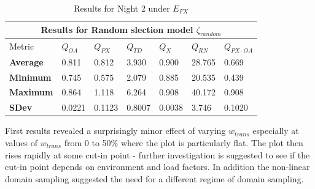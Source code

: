 \begin{table}
\begin{center}
\begin{tabular}{lllllll}
\toprule
\multicolumn{7}{c}{Results for Random slection model $\zeta_{random}$} \\
\midrule
Metric & $Q_{OA}$ & $Q_{PX}$ & $Q_{TD}$ & $Q_{X}$ & $Q_{RN}$ & $Q_{PX \cdot OA}$ \\
\midrule
{\bf Average} & 0.811  & 0.812  & 3.930  & 0.900  & 28.765 & 0.669\\
{\bf Minimum} & 0.745  & 0.575  & 2.079  & 0.885  & 20.535 & 0.439\\
{\bf Maximum} & 0.864  & 1.118  & 6.264  & 0.908  & 40.172 & 0.908\\
{\bf SDev}    & 0.0221 & 0.1123 & 0.8007 & 0.0038 & 3.746 & 0.1020\\
\bottomrule
\end{tabular}
\end{center}
\caption{Results for Night 2 under $E_{FX}$}
\end{table}

First results revealed a surprisingly minor effect of varying $w_{trans}$ especially at values of $w_{trans}$ from 0 to 50\% where the plot is particularly flat. The plot then rises rapidly at some cut-in point - further investigation is suggested to see if the cut-in point depends on environment and load factors. In addition the non-linear domain sampling suggested the need for a different regime of domain sampling. 


